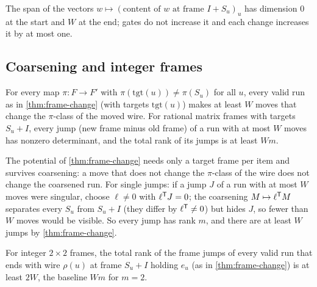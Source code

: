 \begin{outline}
The span of the vectors $w\mapsto(\text{content of }w\text{ at frame }I+S_u)_u$ has dimension $0$ at the
start and $W$ at the end; gates do not increase it and each change increases it by at most one.
\end{outline}

\subsection{Coarsening and integer frames}

\begin{theorem}[Coarsening]\label{thm:coarsening}
For every map $\pi:F\to F'$ with $\pi(\mathrm{tgt}(u))\ne\pi(S_u)$ for all $u$, every valid run as in
\cref{thm:frame-change} (with targets $\mathrm{tgt}(u)$) makes at least $W$ moves that change the
$\pi$-class of the moved wire. For rational matrix frames with targets $S_u+I$, every jump (new frame minus old frame) of a run with at most $W$ moves has nonzero determinant, and the total rank of its jumps is at least $Wm$.
\end{theorem}

\begin{outline}
The potential of \cref{thm:frame-change} needs only a target frame per item and survives coarsening: a move
that does not change the $\pi$-class of the wire does not change the coarsened run. For single jumps: if a jump $J$ of a run with at most $W$ moves were singular, choose $\ell\ne0$ with
$\ell^{\mathsf{T}}J=0$; the coarsening $M\mapsto\ell^{\mathsf{T}}M$ separates every $S_u$ from $S_u+I$ (they differ by
$\ell^{\mathsf{T}}\ne0$) but hides $J$, so fewer than $W$ moves would be visible. So every jump has rank $m$, and
there are at least $W$ jumps by \cref{thm:frame-change}.
\end{outline}

\begin{theorem}\label{thm:mod2}
For integer $2\times2$ frames, the total rank of the frame jumps of every valid run that ends with wire
$\rho(u)$ at frame $S_u+I$ holding $e_u$ (as in \cref{thm:frame-change}) is at least $2W$, the baseline $Wm$ for $m=2$.
\end{theorem}

